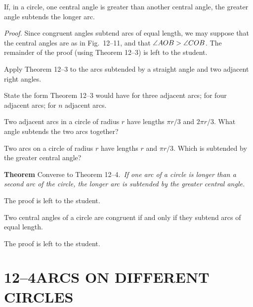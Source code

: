 \documentclass[11pt]{book}
\begin{document}
\FIGXIIELEVENTWELVE

\begin{theorem}
If, in a circle, one central angle is greater than another central angle, the
greater angle subtends the longer arc.
\end{theorem}

\noindent\emph{Proof.} Since congruent angles subtend arcs of equal length, we
may suppose that the central angles are as in Fig.~12--11, and that
$\angle AOB > \angle COB$. The remainder of the proof (using Theorem 12--3) is
left to the student.

\begin{exercisecols}
\begin{exlist}
\item Apply Theorem 12--3 to the arcs subtended by a straight angle and two
      adjacent right angles.
\item State the form Theorem 12--3 would have for three adjacent arcs; for four
      adjacent arcs; for $n$ adjacent arcs.
\item Two adjacent arcs in a circle of radius $r$ have lengths $\pi r/3$ and
      $2\pi r/3$. What angle subtends the two arcs together?
\item Two arcs on a circle of radius $r$ have lengths $r$ and $\pi r/3$. Which
      is subtended by the greater central angle?
\end{exlist}
\end{exercisecols}

\par\medskip\noindent\textbf{Theorem \thetheorem} Converse to Theorem 12--4.\
\emph{If one arc of a circle is longer than a second arc of the circle, the
longer arc is subtended by the greater central angle.}\par\medskip

The proof is left to the student.

\begin{theorem}
Two central angles of a circle are congruent if and only if they subtend arcs of
equal length.
\end{theorem}

The proof is left to the student.

\section*{12--4\quad ARCS ON DIFFERENT CIRCLES}
\end{document}
